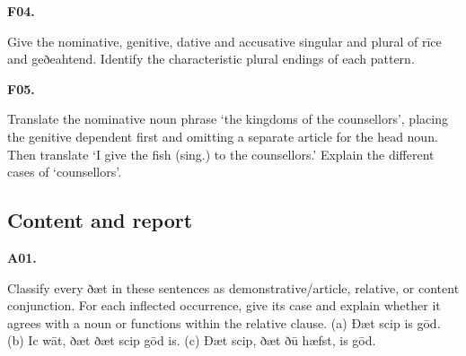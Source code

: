 \par\begin{minipage}{\linewidth}\raggedright
\textbf{F04.}

Give the nominative, genitive, dative and accusative singular and plural of rīce and geðeahtend. Identify the characteristic plural endings of each pattern.

\end{minipage}\par\addvspace{4pt}

\par\begin{minipage}{\linewidth}\raggedright
\textbf{F05.}

Translate the nominative noun phrase ‘the kingdoms of the counsellors’, placing the genitive dependent first and omitting a separate article for the head noun. Then translate ‘I give the fish (sing.) to the counsellors.’ Explain the different cases of ‘counsellors’.

\end{minipage}\par\addvspace{4pt}

\subsection*{Content and report}

\par\begin{minipage}{\linewidth}\raggedright
\textbf{A01.}

Classify every ðæt in these sentences as demonstrative/\allowbreak{}article, relative, or content conjunction. For each inflected occurrence, give its case and explain whether it agrees with a noun or functions within the relative clause. (a) Ðæt scip is gōd. (b) Ic wāt, ðæt ðæt scip gōd is. (c) Ðæt scip, ðæt ðū hæfst, is gōd.

\end{minipage}\par\addvspace{4pt}

